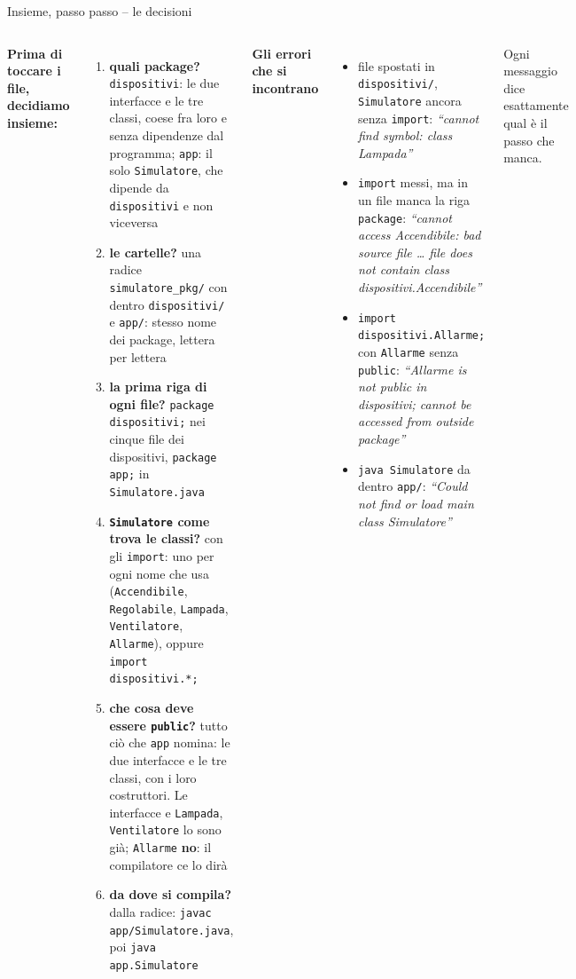 \documentclass[10pt,aspectratio=169]{beamer}
\begin{document}
\begin{frame}[fragile]{Insieme, passo passo -- le decisioni}
\begin{columns}[T]
\footnotesize
\textbf{Prima di toccare i file, decidiamo insieme:}
\begin{enumerate}\itemsep=3pt
    \item \textbf{quali package?} \textrightarrow{} \texttt{dispositivi}: le due interfacce e le tre classi, coese fra loro e senza dipendenze dal programma; \texttt{app}: il solo \texttt{Simulatore}, che dipende da \texttt{dispositivi} e non viceversa
    \item \textbf{le cartelle?} \textrightarrow{} una radice \texttt{simulatore\_pkg/} con dentro \texttt{dispositivi/} e \texttt{app/}: stesso nome dei package, lettera per lettera
    \item \textbf{la prima riga di ogni file?} \textrightarrow{} \texttt{package dispositivi;} nei cinque file dei dispositivi, \texttt{package app;} in \texttt{Simulatore.java}
    \item \textbf{\texttt{Simulatore} come trova le classi?} \textrightarrow{} con gli \texttt{import}: uno per ogni nome che usa (\texttt{Accendibile}, \texttt{Regolabile}, \texttt{Lampada}, \texttt{Ventilatore}, \texttt{Allarme}), oppure \texttt{import dispositivi.*;}
    \item \textbf{che cosa deve essere \texttt{public}?} \textrightarrow{} tutto ciò che \texttt{app} nomina: le due interfacce e le tre classi, con i loro costruttori. Le interfacce e \texttt{Lampada}, \texttt{Ventilatore} lo sono già; \texttt{Allarme} \textbf{no}: il compilatore ce lo dirà
    \item \textbf{da dove si compila?} \textrightarrow{} dalla radice: \texttt{javac app/Simulatore.java}, poi \texttt{java app.Simulatore}
\end{enumerate}

\footnotesize
\textbf{Gli errori che si incontrano}
\begin{itemize}\itemsep=3pt
    \item file spostati in \texttt{dispositivi/}, \texttt{Simulatore} ancora senza \texttt{import}: \emph{``cannot find symbol: class Lampada''}
    \item \texttt{import} messi, ma in un file manca la riga \texttt{package}: \emph{``cannot access Accendibile: bad source file \ldots{} file does not contain class dispositivi.Accendibile''}
    \item \texttt{import dispositivi.Allarme;} con \texttt{Allarme} senza \texttt{public}: \emph{``Allarme is not public in dispositivi; cannot be accessed from outside package''}
    \item \texttt{java Simulatore} da dentro \texttt{app/}: \emph{``Could not find or load main class Simulatore''}
\end{itemize}
\vspace{0.1cm}
Ogni messaggio dice esattamente qual è il passo che manca.
\end{columns}
\end{frame}
\end{document}
